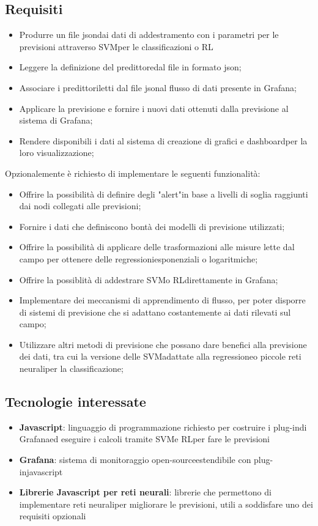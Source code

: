 \subsection{Requisiti}
\begin{itemize}
	\item Produrre un file json\glosp dai dati di addestramento con i parametri per le previsioni attraverso SVM\glosp per le classificazioni o RL\glo
	\item Leggere la definizione del predittore\glosp dal file in formato json\glo;
	\item Associare i predittori\glosp letti dal file json\glosp al flusso di dati presente in Grafana\glo;
	\item Applicare la previsione e fornire i nuovi dati ottenuti dalla previsione al sistema di Grafana\glo;
	\item Rendere disponibili i dati al sistema di creazione di grafici e dashboard\glosp per la loro visualizzazione;
\end{itemize}
Opzionalemente è richiesto di implementare le seguenti funzionalità:
\begin{itemize}
	\item Offrire la possibilità di definire degli "alert"\glo in base a livelli di soglia raggiunti dai nodi collegati alle previsioni;
	\item Fornire i dati che definiscono bontà dei modelli di previsione utilizzati;
	\item Offrire la possibilità di applicare delle trasformazioni alle misure lette dal campo per ottenere delle regressioni\glosp esponenziali o logaritmiche;
	\item Offrire la possiblità di addestrare SVM\glosp o RL\glosp direttamente in Grafana\glo;
	\item Implementare dei meccanismi di apprendimento di flusso, per poter disporre di sistemi di previsione che si adattano costantemente ai dati rilevati sul campo;
	\item Utilizzare altri metodi di previsione che possano dare benefici alla previsione dei dati, tra cui la versione delle SVM\glosp adattate alla regressione\glosp o piccole reti neurali\glosp per la classificazione;
\end{itemize}

\subsection{Tecnologie interessate}
\begin{itemize}
	\item \textbf{Javascript}: linguaggio di programmazione richiesto per costruire i plug-in\glosp di Grafana\glosp ed eseguire i calcoli tramite SVM\glosp e RL\glosp per fare le previsioni
	\item \textbf{Grafana}: sistema di monitoraggio open-source\glosp estendibile con plug-in\glosp javascript\glo
	\item \textbf{Librerie Javascript per reti neurali}: librerie che permettono di implementare reti neurali\glosp per migliorare le previsioni, utili a soddisfare uno dei requisiti opzionali
\end{itemize}

